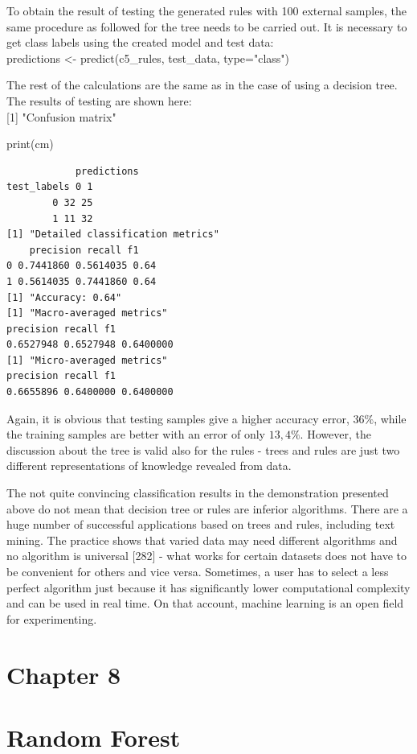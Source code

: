 \documentclass[10pt]{book}
\begin{document}
To obtain the result of testing the generated rules with 100 external samples, the same procedure as followed for the tree needs to be carried out. It is necessary to get class labels using the created model and test data:\\
predictions <- predict(c5\_rules, test\_data, type="class")

The rest of the calculations are the same as in the case of using a decision tree. The results of testing are shown here:\\[0pt]
[1] "Confusion matrix"

\begin{displayquote}
print(cm)
\end{displayquote}

\begin{verbatim}
            predictions
test_labels 0 1
        0 32 25
        1 11 32
[1] "Detailed classification metrics"
    precision recall f1
0 0.7441860 0.5614035 0.64
1 0.5614035 0.7441860 0.64
[1] "Accuracy: 0.64"
[1] "Macro-averaged metrics"
precision recall f1
0.6527948 0.6527948 0.6400000
[1] "Micro-averaged metrics"
precision recall f1
0.6655896 0.6400000 0.6400000
\end{verbatim}

Again, it is obvious that testing samples give a higher accuracy error, $36 \%$, while the training samples are better with an error of only $13,4 \%$. However, the discussion about the tree is valid also for the rules - trees and rules are just two different representations of knowledge revealed from data.

The not quite convincing classification results in the demonstration presented above do not mean that decision tree or rules are inferior algorithms. There are a huge number of successful applications based on trees and rules, including text mining. The practice shows that varied data may need different algorithms and no algorithm is universal [282] - what works for certain datasets does not have to be convenient for others and vice versa. Sometimes, a user has to select a less perfect algorithm just because it has significantly lower computational complexity and can be used in real time. On that account, machine learning is an open field for experimenting.

\section*{Chapter 8}
\section*{Random Forest}
\end{document}
